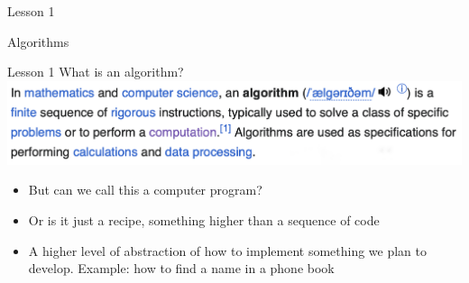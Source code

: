 \documentclass[aspectratio=1610]{beamer}
\begin{document}
\begin{frame}{Lesson 1}{}
\begin{center}
\Huge Algorithms
\end{center}
\end{frame}

\begin{frame}{Lesson 1}{}
{\Huge{What is an algorithm?}}
\includegraphics[scale=0.33]{Images/algorithm.png}

\Large{
\begin{itemize}
    \item But can we call this a \alert{computer program}?
    \item Or is it just a recipe, something higher than a \alert{sequence of code}
    \item A higher level of abstraction of how to implement something we plan to develop. Example: how to find a name in a phone book
\end{itemize}}

\end{frame}
\end{document}

